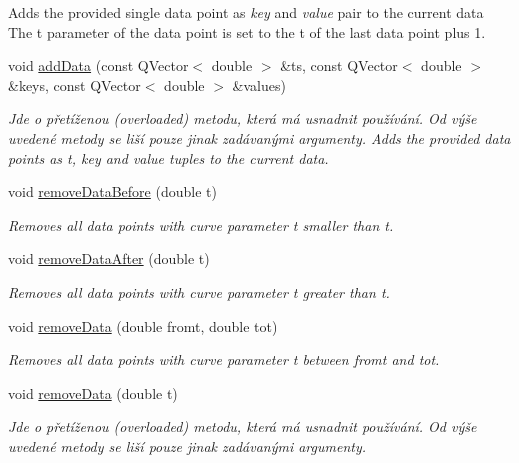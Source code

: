\begin{DoxyCompactItemize}
\begin{DoxyCompactList}
Adds the provided single data point as {\itshape key} and {\itshape value} pair to the current data The t parameter of the data point is set to the t of the last data point plus 1. \end{DoxyCompactList}\item 
void \hyperlink{classQCPCurve_a27c8b3dddd4067d626397ee199626722}{add\+Data} (const Q\+Vector$<$ double $>$ \&ts, const Q\+Vector$<$ double $>$ \&keys, const Q\+Vector$<$ double $>$ \&values)
\begin{DoxyCompactList}\small\item\em Jde o přetíženou (overloaded) metodu, která má usnadnit používání. Od výše uvedené metody se liší pouze jinak zadávanými argumenty. Adds the provided data points as {\itshape t}, {\itshape key} and {\itshape value} tuples to the current data. \end{DoxyCompactList}\item 
void \hyperlink{classQCPCurve_af6f4284fbc2f34e676f24dce03c34fe5}{remove\+Data\+Before} (double t)
\begin{DoxyCompactList}\small\item\em Removes all data points with curve parameter t smaller than {\itshape t}. \end{DoxyCompactList}\item 
void \hyperlink{classQCPCurve_a0365cb947c4e6d405ee22e00191d5f52}{remove\+Data\+After} (double t)
\begin{DoxyCompactList}\small\item\em Removes all data points with curve parameter t greater than {\itshape t}. \end{DoxyCompactList}\item 
void \hyperlink{classQCPCurve_ad45bb5479be799163028ef2b776f7221}{remove\+Data} (double fromt, double tot)
\begin{DoxyCompactList}\small\item\em Removes all data points with curve parameter t between {\itshape fromt} and {\itshape tot}. \end{DoxyCompactList}\item 
void \hyperlink{classQCPCurve_a30c91acfa591ec534c49fed4c0fca39a}{remove\+Data} (double t)
\begin{DoxyCompactList}\small\item\em Jde o přetíženou (overloaded) metodu, která má usnadnit používání. Od výše uvedené metody se liší pouze jinak zadávanými argumenty.


\end{DoxyCompactList}
\end{DoxyCompactItemize}
